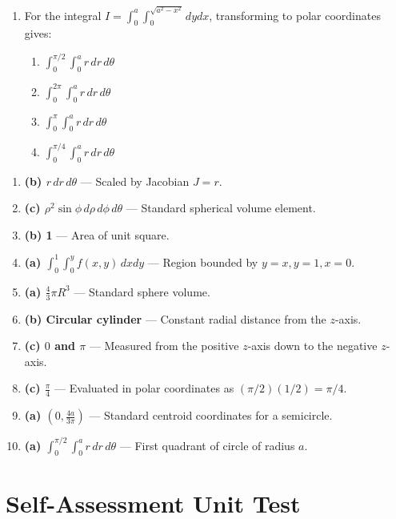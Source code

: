\begin{enumerate}[leftmargin=1.5em]
    \item For the integral $I = \int_0^a \int_0^{\sqrt{a^2-x^2}} dy dx$, transforming to polar coordinates gives:
    \begin{enumerate}[label=(\alph*)]
        \item $\int_0^{\pi/2} \int_0^a r\,dr\,d\theta$
        \item $\int_0^{2\pi} \int_0^a r\,dr\,d\theta$
        \item $\int_0^\pi \int_0^a r\,dr\,d\theta$
        \item $\int_0^{\pi/4} \int_0^a r\,dr\,d\theta$
    \end{enumerate}
\end{enumerate}

\begin{solutionbox}
\begin{enumerate}
    \item \textbf{(b) $r\,dr\,d\theta$} --- Scaled by Jacobian $J = r$.
    \item \textbf{(c) $\rho^2 \sin\phi\,d\rho\,d\phi\,d\theta$} --- Standard spherical volume element.
    \item \textbf{(b) 1} --- Area of unit square.
    \item \textbf{(a) $\int_0^1 \int_0^y f(x,y)\,dx dy$} --- Region bounded by $y=x, y=1, x=0$.
    \item \textbf{(a) $\frac{4}{3}\pi R^3$} --- Standard sphere volume.
    \item \textbf{(b) Circular cylinder} --- Constant radial distance from the $z$-axis.
    \item \textbf{(c) $0$ and $\pi$} --- Measured from the positive $z$-axis down to the negative $z$-axis.
    \item \textbf{(c) $\frac{\pi}{4}$} --- Evaluated in polar coordinates as $(\pi/2)(1/2) = \pi/4$.
    \item \textbf{(a) $\left(0, \frac{4a}{3\pi}\right)$} --- Standard centroid coordinates for a semicircle.
    \item \textbf{(a) $\int_0^{\pi/2} \int_0^a r\,dr\,d\theta$} --- First quadrant of circle of radius $a$.
\end{enumerate}
\end{solutionbox}

\section{Self-Assessment Unit Test}

